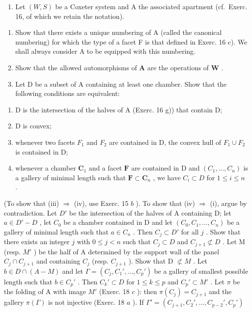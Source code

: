 \begin{enumerate}
\def\labelenumi{\arabic{enumi})}
\setcounter{enumi}{20}
\tightlist
\item
  Let \((W,S)\) be a Coxeter system and A the associated apartment (cf.~Exerc. 16, of which we retain the notation).
\end{enumerate}

\begin{enumerate}
\def\labelenumi{\alph{enumi})}
\item
  Show that there exists a unique numbering of A (called the canonical numbering) for which the type of a facet F is that defined in Exerc. 16 c). We shall always consider A to be equipped with this numbering.
\item
  Show that the allowed automorphisms of \(\mathbf{A}\) are the operations of \(\mathbf{W}\) .
\item
  Let D be a subset of A containing at least one chamber. Show that the following conditions are equivalent:
\end{enumerate}

\begin{enumerate}
\def\labelenumi{(\roman{enumi})}
\item
  D is the intersection of the halves of A (Exerc. 16 g)) that contain D;
\item
  D is convex;
\item
  whenever two facets \(F_{1}\) and \(F_{2}\) are contained in D, the convex hull of \(F_{1} \cup F_{2}\) is contained in D;
\item
  whenever a chamber \(\mathbf{C}_1\) and a facet \(\mathbf{F}\) are contained in \(\mathrm{D}\) and \((C_1, \ldots, C_n)\) is a gallery of minimal length such that \(\mathbf{F} \subset \mathbf{C}_n\) , we have \(C_i \subset D\) for \(1 \leqslant i \leqslant n\) .
\end{enumerate}

(To show that (iii) \(\Longrightarrow\) (iv), use Exerc. 15 \(b\) ). To show that (iv) \(\Longrightarrow\) (i), argue by contradiction. Let \(D'\) be the intersection of the halves of A containing D; let \(a \in D' - D\) , let \(C_0\) be a chamber contained in D and let \((C_0, C_1, \ldots, C_n)\) be a gallery of minimal length such that \(a \in C_n\) . Then \(C_j \subset D'\) for all \(j\) . Show that there exists an integer \(j\) with \(0 \leqslant j < n\) such that \(C_j \subset D\) and \(C_{j+1} \not\subset D\) . Let M (resp. \(M'\) ) be the half of A determined by the support wall of the panel \(C_j \cap C_{j+1}\) and containing \(C_j\) (resp. \(C_{j+1}\) ). Show that D \(\not\subset M\) . Let \(b \in D \cap (A - M)\) and let \(\Gamma = (C_j, C_1', \ldots, C_p')\) be a gallery of smallest possible length such that \(b \in C_p'\) . Then \(C_k' \subset D\) for \(1 \leqslant k \leqslant p\) and \(C_p' \subset M'\) . Let \(\pi\) be the folding of A with image \(M'\) (Exerc. 18 \(c\) ): then \(\pi(C_j) = C_{j+1}\) and the gallery \(\pi(\Gamma)\) is not injective (Exerc. 18 \(a\) ). If \(\Gamma' = (C_{j+1}, C_2', \ldots, C_{p-2}', C_p')\)

